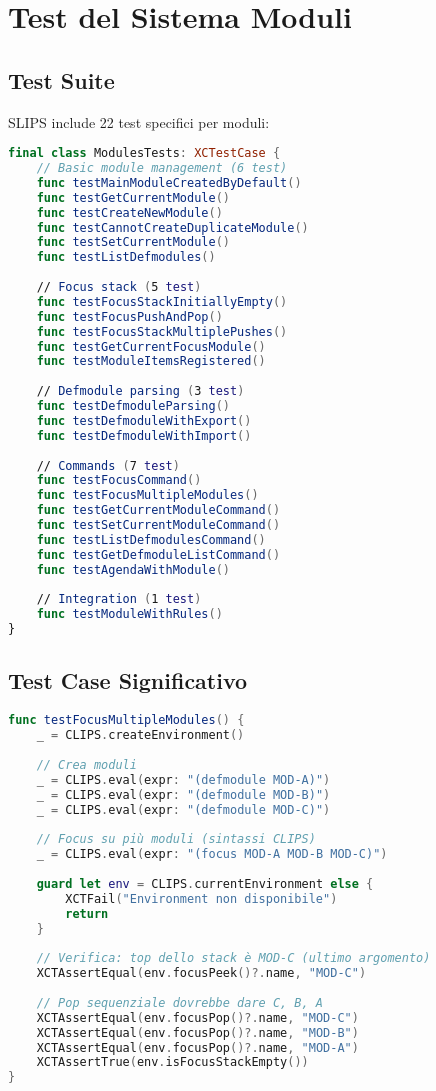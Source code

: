 \section{Test del Sistema Moduli}

\subsection{Test Suite}

SLIPS include 22 test specifici per moduli:

\begin{lstlisting}[language=Swift]
final class ModulesTests: XCTestCase {
    // Basic module management (6 test)
    func testMainModuleCreatedByDefault()
    func testGetCurrentModule()
    func testCreateNewModule()
    func testCannotCreateDuplicateModule()
    func testSetCurrentModule()
    func testListDefmodules()
    
    // Focus stack (5 test)
    func testFocusStackInitiallyEmpty()
    func testFocusPushAndPop()
    func testFocusStackMultiplePushes()
    func testGetCurrentFocusModule()
    func testModuleItemsRegistered()
    
    // Defmodule parsing (3 test)
    func testDefmoduleParsing()
    func testDefmoduleWithExport()
    func testDefmoduleWithImport()
    
    // Commands (7 test)
    func testFocusCommand()
    func testFocusMultipleModules()
    func testGetCurrentModuleCommand()
    func testSetCurrentModuleCommand()
    func testListDefmodulesCommand()
    func testGetDefmoduleListCommand()
    func testAgendaWithModule()
    
    // Integration (1 test)
    func testModuleWithRules()
}
\end{lstlisting}

\subsection{Test Case Significativo}

\begin{lstlisting}[language=Swift]
func testFocusMultipleModules() {
    _ = CLIPS.createEnvironment()
    
    // Crea moduli
    _ = CLIPS.eval(expr: "(defmodule MOD-A)")
    _ = CLIPS.eval(expr: "(defmodule MOD-B)")
    _ = CLIPS.eval(expr: "(defmodule MOD-C)")
    
    // Focus su più moduli (sintassi CLIPS)
    _ = CLIPS.eval(expr: "(focus MOD-A MOD-B MOD-C)")
    
    guard let env = CLIPS.currentEnvironment else {
        XCTFail("Environment non disponibile")
        return
    }
    
    // Verifica: top dello stack è MOD-C (ultimo argomento)
    XCTAssertEqual(env.focusPeek()?.name, "MOD-C")
    
    // Pop sequenziale dovrebbe dare C, B, A
    XCTAssertEqual(env.focusPop()?.name, "MOD-C")
    XCTAssertEqual(env.focusPop()?.name, "MOD-B")
    XCTAssertEqual(env.focusPop()?.name, "MOD-A")
    XCTAssertTrue(env.isFocusStackEmpty())
}
\end{lstlisting}

